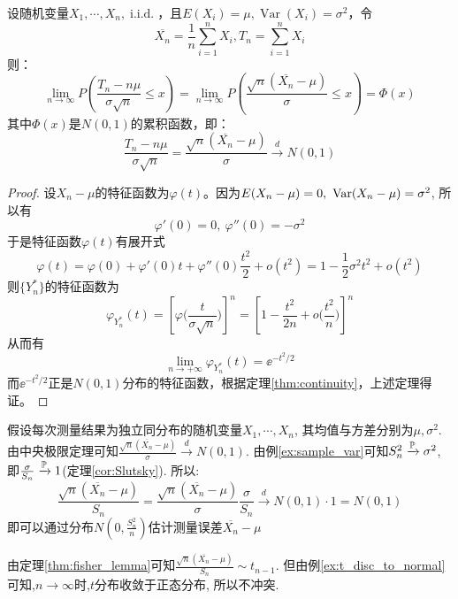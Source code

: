 \begin{theorem}\label{thm:central_limit_Classical}
    设随机变量$X_1,\cdots ,X_n,\operatorname{i.i.d.}$，且$E(X_i)=\mu,\operatorname{Var}(X_i)=\sigma^2$，令
    \[ \overline{X_n} = \frac1n\sum_{i=1}^n X_i, T_n=\sum_{i=1}^n X_i\]
    则：
    \[ \lim_{n \to \infty}P(\frac{T_n-n \mu}{\sigma\sqrt{n}}\le x)=\lim_{n \to \infty}P(\frac{\sqrt{n}(\overline{X_n}-\mu)}{\sigma}\le x) =\Phi(x)\]
    其中$\Phi(x)$是$N(0,1)$的累积函数，即：
    \[ \frac{T_n-n \mu}{\sigma\sqrt{n}}=\frac{\sqrt{n}(\overline{X_n}-\mu)}{\sigma} \xrightarrow{d} N(0,1)\]
\end{theorem}
\begin{proof}
    设$X_n - \mu$的特征函数为$\varphi(t)$。因为$E( X_n - \mu ) = 0 ,\ \Var(X_n - \mu ) = \sigma^2$, 所以有
    \[ \varphi'(0) = 0, \ \varphi''(0) = - \sigma^2 \]
    于是特征函数$\varphi(t)$有展开式
    \[ \varphi(t) = \varphi(0) + \varphi'(0) t + \varphi''(0) \frac{t^2}{2} + o(t^2)= 1 - \frac{1}{2} \sigma^2 t^2 + o(t^2) \]
    则$\{ Y_n^* \}$的特征函数为
    \[ \varphi_{Y_n^*}(t) = \left[ \varphi \biggl( \frac{t}{\sigma \sqrt{n}} \biggr) \right] ^n = \left[ 1 - \frac{t^2}{2n} + o \biggl( \frac{t^2}{n} \biggr) \right]^n  \]
    从而有
    \[ \lim_{n \to +\infty} \varphi_{Y_n^*}(t) = \ee^{-t^2/2} \]
    而$\ee^{-t^2/2}$正是$N(0,1)$分布的特征函数，根据定理\ref{thm:continuity}，上述定理得证。
\end{proof}

\begin{example}[测量误差估计]
    假设每次测量结果为独立同分布的随机变量$X_1,\cdots ,X_n$, 其均值与方差分别为$\mu,\sigma^2$. 由中央极限定理可知$\frac{\sqrt{n}(\overline{X_n}-\mu)}{\sigma} \xrightarrow{d} N(0,1)$. 由例\ref{ex:sample_var}可知$S_n^2 \xrightarrow{\P} \sigma^2$, 即$\frac{\sigma}{S_n} \xrightarrow{\P} 1$(定理\ref{cor:Slutsky}). 所以:
    \[ \frac{\sqrt{n}(\overline{X_n}-\mu)}{S_n}=\frac{\sqrt{n}(\overline{X_n}-\mu)}{\sigma}\frac{\sigma}{S_n} \xrightarrow{d} N(0,1)\cdot 1=N(0,1) \]
    即可以通过分布$N(0,\frac{S_n^2}{n})$估计测量误差$\overline{X_n}-\mu$
\end{example}
\begin{remark}
    由定理\ref{thm:fisher_lemma}可知$\frac{\sqrt{n}(\overline{X_n}-\mu)}{S_n} \sim t_{n-1}$. 但由例\ref{ex:t_disc_to_normal}可知,$n\to \infty$时,$t$分布收敛于正态分布, 所以不冲突.
\end{remark}

